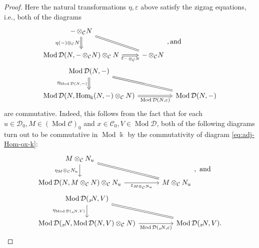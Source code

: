 \documentclass{surv-l}
\numberwithin{equation}{chapter}
\numberwithin{figure}{chapter}
\theoremstyle{plain}
\theoremstyle{definition}
\theoremstyle{remark}
\newcommand{\llow}[1]{{}_{#1}\!}
\newcommand{\Ar}[3]{\ar[from={#1}, to={#2}, #3]}
\DeclareMathOperator{\Hom}{Hom}
\DeclareMathOperator{\Mod}{Mod}
\DeclareMathOperator{\blank}{-}
\begin{document}
\begin{proof}
Here the natural transformations $\eta, \varepsilon$ above satisfy the zigzag equations,
i.e., both of the diagrams
\[
\begin{aligned}
&
\begin{tikzcd}
\blank \otimes_{\mathcal{C}} N\\
\Mod{\mathcal{D}}(N, \blank \otimes_{\mathcal{C}} N) \otimes_{\mathcal{C}} N  & \blank \otimes_{\mathcal{C}} N
\Ar{1-1}{2-1}{"\eta(\blank)\otimes_{\mathcal{C}} N" ', Rightarrow}
\Ar{2-1}{2-2}{"\varepsilon_{\blank \otimes_{\mathcal{C}} N}" ', Rightarrow}
\Ar{1-1}{2-2}{Rightarrow, no head}
\end{tikzcd}, \text{and}
\\
&
\begin{tikzcd}[column sep=5em]
\Mod{\mathcal{D}}(N, \blank)\\
\Mod{\mathcal{D}}(N, \Hom_\Bbbk(N,\blank) \otimes_{\mathcal{C}} N) &\Mod{\mathcal{D}}(N, \blank)
\Ar{1-1}{2-1}{"{\eta_{\Mod{\mathcal{D}}(N, \blank)}}" ', Rightarrow}
\Ar{2-1}{2-2}{"{\Mod{\mathcal{D}}(N, \varepsilon)}" ', Rightarrow}
\Ar{1-1}{2-2}{Rightarrow, no head}
\end{tikzcd}
\end{aligned}
\]
are commutative.
Indeed, this follows from the fact that for each $u \in {\mathcal{D}}_0, M \in (\Mod{\mathcal{C}})_0$ and
$x \in {\mathcal{C}}_0, V \in \Mod{\mathcal{D}}$, both of the following diagrams turn out to be commutative in $\Mod\Bbbk$
by the commutativity of diagram \eqref{eq:adj-Hom-ox-k}:
\[
\begin{aligned}
&
\begin{tikzcd}[column sep=5em]
M \otimes_{\mathcal{C}} N_u\\
\Mod{\mathcal{D}}(N, M \otimes_{\mathcal{C}} N) \otimes_{\mathcal{C}} N_u  & M \otimes_{\mathcal{C}} N_u
\Ar{1-1}{2-1}{"\eta_M\otimes_{\mathcal{C}} N_u" ', rightarrow}
\Ar{2-1}{2-2}{"\varepsilon_{M\otimes_{\mathcal{C}} N_u}" ', rightarrow}
\Ar{1-1}{2-2}{Rightarrow, no head}
\end{tikzcd}, \text{ and}
\\
&
\begin{tikzcd}[column sep=5em]
\Mod{\mathcal{D}}(\llow{x}N, V)\\
\Mod{\mathcal{D}}(\llow{x}N, \Mod{\mathcal{D}}(N,V) \otimes_{\mathcal{C}} N) & \Mod{\mathcal{D}}(\llow{x}N, V).
\Ar{1-1}{2-1}{"{\eta_{\Mod{\mathcal{D}}(\llow{x}N, V)}}" ', rightarrow}
\Ar{2-1}{2-2}{"{\Mod{\mathcal{D}}(\llow{x}N, \varepsilon)}" ', rightarrow}
\Ar{1-1}{2-2}{Rightarrow, no head}
\end{tikzcd}
\end{aligned}
\]
\end{proof}
\end{document}
